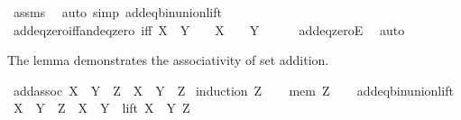 \begin{isabellebody}
%
\isatagproof
{}\isamarkupfalse%
\ assms\ \isamarkupfalse%
\ {\isacharparenleft}{\kern0pt}auto\ simp{\isacharcolon}{\kern0pt}\ add{\isacharunderscore}{\kern0pt}eq{\isacharunderscore}{\kern0pt}bin{\isacharunderscore}{\kern0pt}union{\isacharunderscore}{\kern0pt}lift{\isacharparenright}{\kern0pt}%
\endisatagproof
{\isafoldproof}%
%
\isadelimproof
\isanewline
%
\endisadelimproof
\isanewline
{}\isamarkupfalse%
\ add{\isacharunderscore}{\kern0pt}eq{\isacharunderscore}{\kern0pt}zero{\isacharunderscore}{\kern0pt}iff{\isacharunderscore}{\kern0pt}and{\isacharunderscore}{\kern0pt}eq{\isacharunderscore}{\kern0pt}zero\ {\isacharbrackleft}{\kern0pt}iff{\isacharbrackright}{\kern0pt}{\isacharcolon}{\kern0pt}\ {\isachardoublequoteopen}X\ {\isacharplus}{\kern0pt}\ Y\ {\isacharequal}{\kern0pt}\ {}\ {\isasymlongleftrightarrow}\ X\ {\isacharequal}{\kern0pt}\ {}\ {\isasymand}\ Y\ {\isacharequal}{\kern0pt}\ {}{\isachardoublequoteclose}\isanewline
%
\isadelimproof
\ \ %
\endisadelimproof
%
\isatagproof
{}\isamarkupfalse%
\ add{\isacharunderscore}{\kern0pt}eq{\isacharunderscore}{\kern0pt}zeroE\ \isamarkupfalse%
\ auto%
\endisatagproof
{\isafoldproof}%
%
\isadelimproof
%
\endisadelimproof
%
\begin{isamarkuptext}%
The lemma demonstrates the associativity of set addition.%
\end{isamarkuptext}\isamarkuptrue%
\isamarkupfalse%
\ add{\isacharunderscore}{\kern0pt}assoc{\isacharcolon}{\kern0pt}\ {\isachardoublequoteopen}{\isacharparenleft}{\kern0pt}X\ {\isacharplus}{\kern0pt}\ Y{\isacharparenright}{\kern0pt}\ {\isacharplus}{\kern0pt}\ Z\ {\isacharequal}{\kern0pt}\ X\ {\isacharplus}{\kern0pt}\ {\isacharparenleft}{\kern0pt}Y\ {\isacharplus}{\kern0pt}\ Z{\isacharparenright}{\kern0pt}{\isachardoublequoteclose}\isanewline
%
\isadelimproof
%
\endisadelimproof
%
\isatagproof
{}\isamarkupfalse%
\ {\isacharparenleft}{\kern0pt}induction\ Z{\isacharparenright}{\kern0pt}\isanewline
\ \ \isamarkupfalse%
\ {\isacharparenleft}{\kern0pt}mem\ Z{\isacharparenright}{\kern0pt}\isanewline
\ \ \isamarkupfalse%
\ add{\isacharunderscore}{\kern0pt}eq{\isacharunderscore}{\kern0pt}bin{\isacharunderscore}{\kern0pt}union{\isacharunderscore}{\kern0pt}lift\ \isamarkupfalse%
\ {\isachardoublequoteopen}{\isacharparenleft}{\kern0pt}X\ {\isacharplus}{\kern0pt}\ Y{\isacharparenright}{\kern0pt}\ {\isacharplus}{\kern0pt}\ Z\ {\isacharequal}{\kern0pt}\ {\isacharparenleft}{\kern0pt}X\ {\isacharplus}{\kern0pt}\ Y{\isacharparenright}{\kern0pt}\ {\isasymunion}\ {\isacharparenleft}{\kern0pt}lift\ {\isacharparenleft}{\kern0pt}X\ {\isacharplus}{\kern0pt}\ Y{\isacharparenright}{\kern0pt}\ Z{\isacharparenright}{\kern0pt}{\isachardoublequoteclose}\ \isamarkupfalse%

\end{isabellebody}

